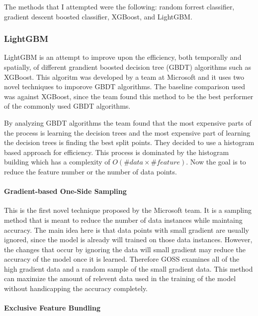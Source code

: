 \documentclass[11pt]{article}
\begin{document}
The methods that I attempted were the following: random forrest
classifier, gradient descent boosted classifier, XGBoost, and LightGBM.

    \hypertarget{lightgbm}{%
\subsubsection{LightGBM}\label{lightgbm}}

LightGBM is an attempt to improve upon the efficiency, both temporally
and spatially, of different grandient boosted decision tree (GBDT)
algorithms such as XGBoost. This algoritm was developed by a team at
Microsoft and it uses two novel techniques to imporove GBDT algorithms.
The baseline comparison used was against XGBoost, since the team found
this method to be the best performer of the commonly used GBDT
algorithms.

By analyzing GBDT algorithms the team found that the most expensive
parts of the process is learning the decision trees and the most
expensive part of learning the decision trees is finding the best split
points. They decided to use a histogram based approach for efficiency.
This process is dominated by the histogram building which has a
complexity of \(O(\#data \times \#feature)\). Now the goal is to reduce
the feature number or the number of data points.

\hypertarget{gradient-based-one-side-sampling}{%
\paragraph{Gradient-based One-Side
Sampling}\label{gradient-based-one-side-sampling}}

This is the first novel technique proposed by the Microsoft team. It is
a sampling method that is meant to reduce the number of data instances
while maintaing accuracy. The main idea here is that data points with
small gradient are usually ignored, since the model is already will
trained on those data instances. However, the changes that occur by
ignoring the data will small gradient may reduce the accuracy of the
model once it is learned. Therefore GOSS examines all of the high
gradient data and a random sample of the small gradient data. This
method can maximize the amount of relevent data used in the training of
the model without handicapping the accuracy completely.

\hypertarget{exclusive-feature-bundling}{%
\paragraph{Exclusive Feature
Bundling}\label{exclusive-feature-bundling}}
\end{document}

